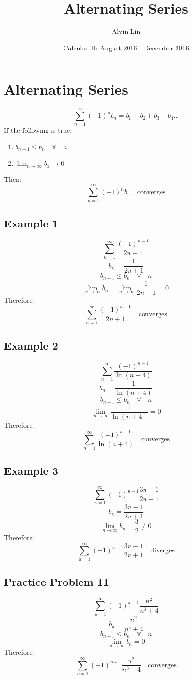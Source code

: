 \documentclass[letterpaper, 12pt]{math}
\title{Alternating Series}
\author{Alvin Lin}
\date{Calculus II: August 2016 - December 2016}
\begin{document}
\maketitle

\section*{Alternating Series}
\[ \sum_{n=1}^{\infty}(-1)^{n}b_{n} = b_{1}-b_{2}+b_{3}-b_{4}... \]
If the following is true:
\begin{enumerate}
  \item \( b_{n+1} \leq b_{n} \quad \forall \quad n \)
  \item \( \lim_{n\to\infty}b_{n} \to 0 \)
\end{enumerate}
Then:
\[ \sum_{n=1}^{\infty}(-1)^{n}b_{n} \quad \mathrm{converges} \]

\subsection*{Example 1}
\[ \sum_{n=1}^{\infty}\frac{(-1)^{n-1}}{2n+1} \]
\[ b_{n} = \frac{1}{2n+1} \]
\[ b_{n+1} \leq b_{n} \quad \forall \quad n \]
\[ \lim_{n\to\infty}b_{n} = \lim_{n\to\infty}\frac{1}{2n+1} = 0 \]
Therefore:
\[ \sum_{n=1}^{\infty}\frac{(-1)^{n-1}}{2n+1} \quad \mathrm{converges} \]

\subsection*{Example 2}
\[ \sum_{n=1}^{\infty}\frac{(-1)^{n-1}}{\ln(n+4)} \]
\[ b_{n} = \frac{1}{\ln(n+4)} \]
\[ b_{n+1} \leq b_{n} \quad \forall \quad n \]
\[ \lim_{n\to\infty}\frac{1}{\ln(n+4)} = 0 \]
Therefore:
\[ \sum_{n=1}^{\infty}\frac{(-1)^{n-1}}{\ln(n+4)} \quad \mathrm{converges} \]

\subsection*{Example 3}
\[ \sum_{n=1}^{\infty}(-1)^{n-1}\frac{3n-1}{2n+1} \]
\[ b_{n} = \frac{3n-1}{2n+1} \]
\[ \lim_{n\to\infty}b_{n} = \frac{3}{2} \neq 0 \]
Therefore:
\[ \sum_{n=1}^{\infty}(-1)^{n-1}\frac{3n-1}{2n+1} \quad \mathrm{diverges} \]

\subsection*{Practice Problem 11}
\[ \sum_{n=1}^{\infty}(-1)^{n-1}\frac{n^{2}}{n^{3}+4} \]
\[ b_{n} = \frac{n^{2}}{n^{3}+4} \]
\[ b_{n+1} \leq b_{n} \quad \forall \quad n \]
\[ \lim_{n\to\infty}b_{n} = 0 \]
Therefore:
\[ \sum_{n=1}^{\infty}(-1)^{n-1}\frac{n^{2}}{n^{3}+4} \quad
   \mathrm{converges} \]
\end{document}
